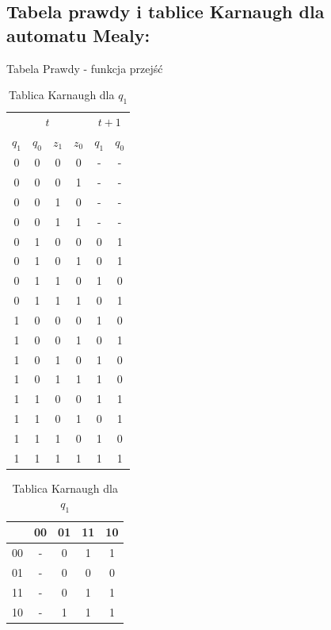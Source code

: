 \documentclass[12pt,a4paper]{article}
\begin{document}
		\subsection{Tabela prawdy i tablice Karnaugh dla automatu Mealy:}
			\begin{table}[H]
			\begin{minipage}{.5\textwidth}
				\caption{Tabela Prawdy - funkcja przejść}
				\vspace{0.2cm}
				\centering
				\begin{tabular}{cccc|cc}
					\multicolumn{4}{c|}{\(t\)}	&	\multicolumn{2}{c}{\(t+1\)} \\
					\(q_1\)&\(q_0\)&\(z_1\)&\(z_0\)&\(q_1\)&\(q_0\)\\\hline
					0	&	0	&	0	&	0	&	-	&	-	\\
					0	&	0	&	0	&	1	&	-	&	-	\\
					0	&	0	&	1	&	0	&	-	&	-	\\
					0	&	0	&	1	&	1	&	-	&	-	\\\hline
					0	&	1	&	0	&	0	&	0	&	1	\\
					0	&	1	&	0	&	1	&	0	&	1	\\
					0	&	1	&	1	&	0	&	1	&	0	\\
					0	&	1	&	1	&	1	&	0	&	1	\\\hline
					1	&	0	&	0	&	0	&	1	&	0	\\
					1	&	0	&	0	&	1	&	0	&	1	\\
					1	&	0	&	1	&	0	&	1	&	0	\\
					1	&	0	&	1	&	1	&	1	&	0	\\\hline
					1	&	1	&	0	&	0	&	1	&	1	\\
					1	&	1	&	0	&	1	&	0	&	1	\\
					1	&	1	&	1	&	0	&	1	&	0	\\
					1	&	1	&	1	&	1	&	1	&	1	\\
				\end{tabular}
			\end{minipage}%
			\begin{minipage}{.5\textwidth}
				\caption{Tablica Karnaugh dla $q_1$}
				\vspace{0.2cm}
				\centering
				\begin{tabular}{c|c|c|c|c}
					\backslashbox{$z_1z_0$}{$q_1q_0$}&00&01&11&10\\\hline
					00	&	-	&	0	&	1	&	1	\\\hline
					01	&	-	&	0	&	0	&	0	\\\hline
					11	&	-	&	0	&	1	&	1	\\\hline
					10	&	-	&	1	&	1	&	1	
				\end{tabular}
				\vspace{1cm}
				

\end{minipage}
\end{table}
\end{document}
